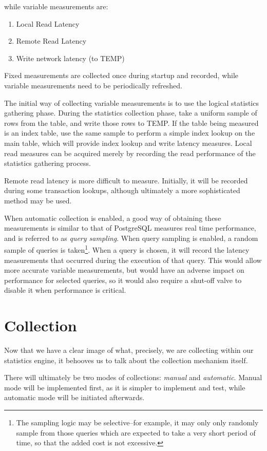 while variable measurements are:
\begin{enumerate}
				\item Local Read Latency
				\item Remote Read Latency
				\item Write network latency (to TEMP)
\end{enumerate}

Fixed measurements are collected once during startup and recorded, while variable measurements need to be periodically refreshed. 

The initial way of collecting variable measurements is to use the logical statistics gathering phase. During the statistics collection phase, take a uniform sample of rows from the table, and write those rows to TEMP. If the table being measured is an index table, use the same sample to perform a simple index lookup on the main table, which will provide index lookup and write latency measures. Local read measures can be acquired merely by recording the read performance of the statistics gathering process.

Remote read latency is more difficult to measure. Initially, it will be recorded during some transaction lookups, although ultimately a more sophisticated method may be used.

When automatic collection is enabled, a good way of obtaining these measurements is similar to that of PostgreSQL\cite{PGCollector} measures real time performance, and is referred to as \emph{query sampling}. When query sampling is enabled, a random sample of queries is taken\footnote{The sampling logic may be selective--for example, it may only only randomly sample from those queries which are expected to take a very short period of time, so that the added cost is not excessive.}. When a query is chosen, it will record the latency measurements that occurred during the execution of that query. This would allow more accurate variable measurements, but would have an adverse impact on performance for selected queries, so it would also require a shut-off valve to disable it when performance is critical.

\section{Collection}
Now that we have a clear image of what, precisely, we are collecting within our statistics engine, it behooves us to talk about the collection mechanism itself.

There will ultimately be two modes of collections: \emph{manual} and \emph{automatic}. Manual mode will be implemented first, as it is simpler to implement and test, while automatic mode will be initiated afterwards.

